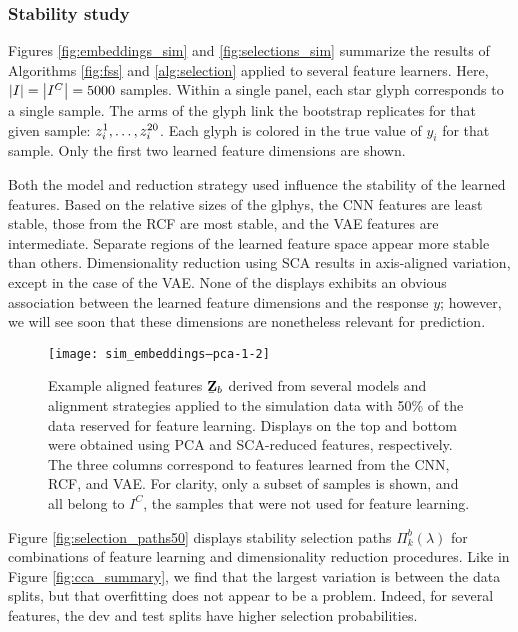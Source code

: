 \subsubsection{Stability study}

Figures \ref{fig:embeddings_sim} and \ref{fig:selections_sim} summarize the
results of Algorithms \ref{fig:fss} and \ref{alg:selection} applied to several
feature learners. Here, $\left|I\right| = \left|I^{C}\right| = 5000$ samples. Within a
single panel, each star glyph corresponds to a single sample. The arms of the
glyph link the bootstrap replicates for that given sample: $\protect z_{i}^{1},
\dots, z_{i}^{20}$. Each glyph is colored in the true value of $y_{i}$ for that
sample. Only the first two learned feature dimensions are shown.

Both the model and reduction strategy used influence the stability of the
learned features. Based on the relative sizes of the glphys, the CNN features
are least stable, those from the RCF are most stable, and the VAE features are
intermediate. Separate regions of the learned feature space appear more stable
than others. Dimensionality reduction using SCA results in axis-aligned
variation, except in the case of the VAE. None of the displays exhibits an
obvious association between the learned feature dimensions and the response $y$;
however, we will see soon that these dimensions are nonetheless relevant for
prediction.

\begin{figure}
  \centering
  \texttt{[image: sim\_embeddings--pca-1-2]}
  \caption{Example aligned features
    $\protect\underaccent{\bar}{\mathbf{Z}}_{b}$ derived from several models
    and alignment strategies applied to the simulation data with 50\% of the
    data reserved for feature learning. Displays on the top and bottom were
    obtained using PCA and SCA-reduced features, respectively. The three columns
    correspond to features learned from the CNN, RCF, and VAE. For clarity, only
    a subset of samples is shown, and all belong to $I^{C}$, the samples that
    were not used for feature learning.}
  \label{fig:sim_embeddings-pca-1-2}
\end{figure}

 Figure \ref{fig:selection_paths50} displays stability selection paths
 $\Pi_{k}^{b}\left(\lambda\right)$ for combinations of feature learning and
 dimensionality reduction procedures. Like in Figure \ref{fig:cca_summary}, we
 find that the largest variation is between the data splits, but that
 overfitting does not appear to be a problem. Indeed, for several features, the
 dev and test splits have higher selection probabilities.


